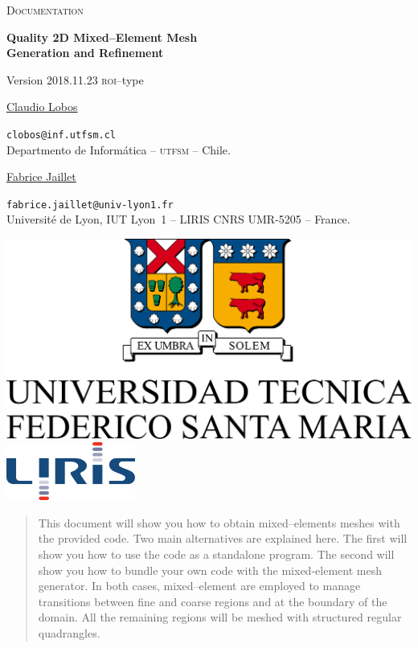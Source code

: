 \documentclass[10pt]{article}
\begin{document}
\begin{minipage}{0.7\textwidth}

{\LARGE \textsc{Documentation}}

{\Large \textbf{Quality 2D Mixed--Element Mesh\\ Generation and Refinement}

{\large Version 2018.11.23 \textsc{roi}--type}}

\underline{\large Claudio Lobos}

\small \texttt{clobos@inf.utfsm.cl}\\
\small Departmento de Inform\'atica -- \textsc{utfsm}  -- Chile.

\underline{\large Fabrice Jaillet}

\small \texttt{fabrice.jaillet@univ-lyon1.fr}\\
\small Universit\'e de Lyon, IUT Lyon~1 -- LIRIS CNRS UMR-5205  -- France.
\end{minipage}
\hfill
\begin{minipage}{0.28\textwidth}
\includegraphics[width=\textwidth]{utfsm-all-oc.pdf}
\includegraphics[width=\textwidth]{logo_liris_160_0.png}
\end{minipage}

\vspace{0.5cm}

\begin{abstract}
This document will show you how to obtain mixed--elements meshes with the provided code. Two main alternatives are explained here. The first will show you how to use the code as a standalone program. The second will show you how to bundle your own code with the mixed-element mesh generator. In both cases, mixed--element are employed to manage transitions between fine and coarse regions and at the boundary of the domain. All the remaining regions will be meshed with structured regular quadrangles.
\end{abstract}
\end{document}
